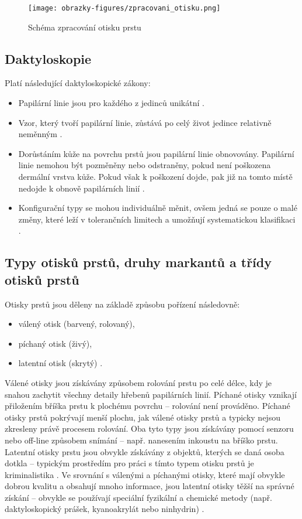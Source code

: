 \begin{figure}[!htbp]
    \centering
    \texttt{[image: obrazky-figures/zpracovani\_otisku.png]}
    \caption{Schéma zpracování otisku prstu \cite{BIOopora}}
    \label{fig:zpracovani}
\end{figure}

\subsection*{Daktyloskopie}
Platí následující daktyloskopické zákony:
\begin{itemize}
    \item Papilární linie jsou pro každého z jedinců unikátní \cite{BIOopora}.
    \item Vzor, který tvoří papilární linie, zůstává po celý život jedince relativně neměnným \cite{BIOopora}. 
    \item Dorůstáním kůže na povrchu prstů jsou papilární linie obnovovány. Papilární linie nemohou být pozměněny nebo odstraněny, pokud není poškozena dermální vrstva kůže. Pokud však k poškození dojde, pak již na tomto místě nedojde k obnově papilárních linií \cite{BIOopora}.
    \item Konfigurační typy se mohou individuálně měnit, ovšem jedná se pouze o malé změny, které leží v tolerančních limitech a umožňují systematickou klasifikaci \cite{BIOopora}.
\end{itemize}
\subsection*{Typy otisků prstů, druhy markantů a třídy otisků prstů}
Otisky prstů jsou děleny na základě způsobu pořízení následovně:
\begin{itemize}
\item válený otisk (barvený, rolovaný),
\item píchaný otisk (živý),
\item latentní otisk (skrytý) \cite{BIOopora}.
\end{itemize}

Válené otisky jsou získávány způsobem rolování prstu po celé délce, kdy je snahou zachytit všechny detaily hřebenů papilárních linií. Píchané otisky vznikají přiložením bříška prstu k plochému povrchu -- rolování není prováděno. Píchané otisky prstů pokrývají menší plochu, jak válené otisky prstů a typicky nejsou zkresleny právě procesem rolování. Oba tyto typy jsou získávány pomocí senzoru nebo off-line způsobem snímání -- např. nanesením inkoustu na bříško prstu. Latentní otisky prstu jsou obvykle získávány z objektů, kterých se daná osoba dotkla -- typickým prostředím pro práci s tímto typem otisku prstů je kriminalistika \cite{LatentFingerprintMatching}. Ve srovnání s válenými a píchanými otisky, které mají obvykle dobrou kvalitu a obsahují mnoho informace, jsou latentní otisky těžší na správné získání -- obvykle se používají speciální fyzikální a chemické metody (např. daktyloskopický prášek, kyanoakrylát nebo ninhydrin) \cite{BIOdaktylLecture}.

